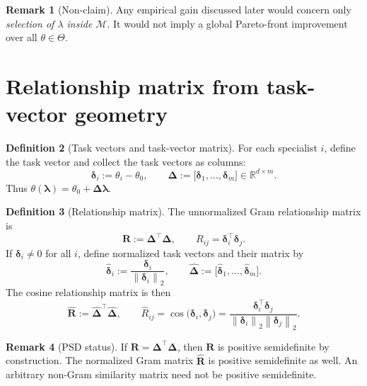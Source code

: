 \documentclass[12pt,a4paper]{report}
\newcommand{\R}{\mathbb{R}}
\newcommand{\1}{\mathbf{1}}
\newcommand{\norm}[1]{\left\lVert #1 \right\rVert}
\newcommand{\Mfam}{\mathcal{M}}
\theoremstyle{definition}
\newtheorem{definition}{Definition}
\newtheorem{remark}[definition]{Remark}
\begin{document}
\begin{remark}[Non-claim]
\label{rem:non-claim}
Any empirical gain discussed later would concern only \emph{selection of \(\lambda\) inside \(\Mfam\)}. It would not imply a global Pareto-front improvement over all \(\theta\in\Theta\).
\end{remark}

\section{Relationship matrix from task-vector geometry}
\label{sec:relationship-matrix}

\begin{definition}[Task vectors and task-vector matrix]
\label{def:task-vector-matrix}
For each specialist \(i\), define the task vector and collect the task vectors as columns:
\[
\boldsymbol{\delta}_i:=\theta_i-\theta_0,
\qquad
\boldsymbol{\Delta}:=\bigl[\boldsymbol{\delta}_1,\dots,\boldsymbol{\delta}_m\bigr]\in\R^{d\times m}.
\]
Thus \(\theta(\boldsymbol{\lambda})=\theta_0+\boldsymbol{\Delta}\boldsymbol{\lambda}\).
\end{definition}

\begin{definition}[Relationship matrix]
\label{def:relationship-matrix}
The unnormalized Gram relationship matrix is
\[
\mathbf R:=\boldsymbol{\Delta}^{\top}\boldsymbol{\Delta},
\qquad
R_{ij}=\boldsymbol{\delta}_i^{\top}\boldsymbol{\delta}_j.
\]
If \(\boldsymbol{\delta}_i\neq 0\) for all \(i\), define normalized task vectors and their matrix by
\[
\widehat{\boldsymbol{\delta}}_i:=\frac{\boldsymbol{\delta}_i}{\norm{\boldsymbol{\delta}_i}_2},
\qquad
\widehat{\boldsymbol{\Delta}}:=\bigl[\widehat{\boldsymbol{\delta}}_1,\dots,\widehat{\boldsymbol{\delta}}_m\bigr].
\]
The cosine relationship matrix is then
\[
\widehat{\mathbf R}:=\widehat{\boldsymbol{\Delta}}^{\top}\widehat{\boldsymbol{\Delta}},
\qquad
\widehat R_{ij}=\cos\bigl(\boldsymbol{\delta}_i,\boldsymbol{\delta}_j\bigr)
=\frac{\boldsymbol{\delta}_i^{\top}\boldsymbol{\delta}_j}{\norm{\boldsymbol{\delta}_i}_2\norm{\boldsymbol{\delta}_j}_2}.
\]
\end{definition}

\begin{remark}[PSD status]
\label{rem:psd}
If \(\mathbf R=\boldsymbol{\Delta}^{\top}\boldsymbol{\Delta}\), then \(\mathbf R\) is positive semidefinite by construction. The normalized Gram matrix \(\widehat{\mathbf R}\) is positive semidefinite as well. An arbitrary non-Gram similarity matrix need not be positive semidefinite.
\end{remark}
\end{document}
